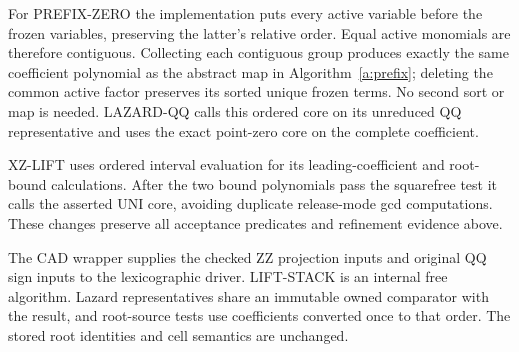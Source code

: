 \documentclass[11pt]{article}
\theoremstyle{definition}
\begin{document}
For PREFIX-ZERO the implementation puts every active variable before the frozen
variables, preserving the latter's relative order. Equal active monomials are
therefore contiguous. Collecting each contiguous group produces exactly the same
coefficient polynomial as the abstract map in Algorithm~\ref{a:prefix}; deleting
the common active factor preserves its sorted unique frozen terms. No second
sort or map is needed. LAZARD-QQ calls this ordered core on its unreduced QQ
representative and uses the exact point-zero core on the complete coefficient.

XZ-LIFT uses ordered interval evaluation for its leading-coefficient and root-bound
calculations. After the two bound polynomials pass the squarefree test it calls
the asserted UNI core, avoiding duplicate release-mode gcd computations. These
changes preserve all acceptance predicates and refinement evidence above.

The CAD wrapper supplies the checked ZZ projection inputs and original QQ sign
inputs to the lexicographic driver. LIFT-STACK is an internal free algorithm.
Lazard representatives share an immutable owned comparator with the result,
and root-source tests use coefficients converted once to that order. The stored
root identities and cell semantics are unchanged.
\end{document}
